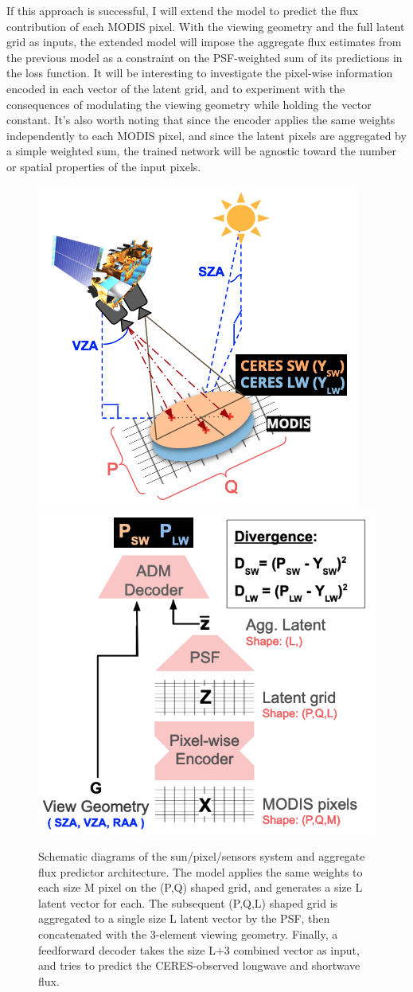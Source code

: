 \documentclass[11pt]{article}
\begin{document}
If this approach is successful, I will extend the model to predict the flux contribution of each MODIS pixel. With the viewing geometry and the full latent grid as inputs, the extended model will impose the aggregate flux estimates from the previous model as a constraint on the PSF-weighted sum of its predictions in the loss function. It will be interesting to investigate the pixel-wise information encoded in each vector of the latent grid, and to experiment with the consequences of modulating the viewing geometry while holding the vector constant. It's also worth noting that since the encoder applies the same weights independently to each MODIS pixel, and since the latent pixels are aggregated by a simple weighted sum, the trained network will be agnostic toward the number or spatial properties of the input pixels.

\begin{figure}[h!]
    \centering

    \includegraphics[width=.38\linewidth]{figs/sat_schematic.png}
    \includegraphics[width=.38\linewidth]{figs/model_arch.png}

    \caption{Schematic diagrams of the sun/pixel/sensors system and aggregate flux predictor architecture. The model applies the same weights to each size M pixel on the (P,Q) shaped grid, and generates a size L latent vector for each. The subsequent (P,Q,L) shaped grid is aggregated to a single size L latent vector by the PSF, then concatenated with the 3-element viewing geometry. Finally, a feedforward decoder takes the size L+3 combined vector as input, and tries to predict the CERES-observed longwave and shortwave flux.}
    \label{schematic}
\end{figure}
\end{document}
